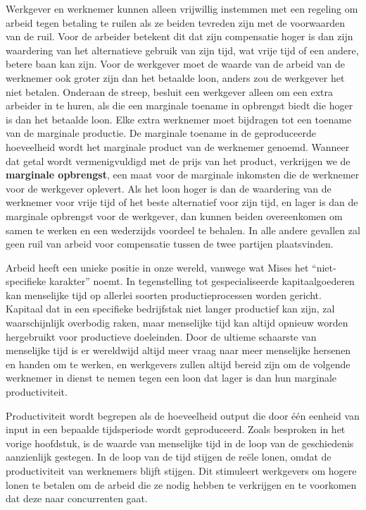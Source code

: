 Werkgever en werknemer kunnen alleen vrijwillig instemmen met een
regeling om arbeid tegen betaling te ruilen als ze beiden tevreden zijn
met de voorwaarden van de ruil. Voor de arbeider betekent dit dat zijn
compensatie hoger is dan zijn waardering van het alternatieve gebruik
van zijn tijd, wat vrije tijd of een andere, betere baan kan zijn. Voor
de werkgever moet de waarde van de arbeid van de werknemer ook groter
zijn dan het betaalde loon, anders zou de werkgever het niet betalen.
Onderaan de streep, besluit een werkgever alleen om een extra arbeider
in te huren, als die een marginale toename in opbrengst biedt die hoger
is dan het betaalde loon. Elke extra werknemer moet bijdragen tot een
toename van de marginale productie. De marginale toename in de
geproduceerde hoeveelheid wordt het marginale product van de werknemer
genoemd. Wanneer dat getal wordt vermenigvuldigd met de prijs van het
product, verkrijgen we de \textbf{marginale opbrengst}, een maat voor de
marginale inkomsten die de werknemer voor de werkgever oplevert. Als het
loon hoger is dan de waardering van de werknemer voor vrije tijd of het
beste alternatief voor zijn tijd, en lager is dan de marginale opbrengst
voor de werkgever, dan kunnen beiden overeenkomen om samen te werken en
een wederzijds voordeel te behalen. In alle andere gevallen zal geen
ruil van arbeid voor compensatie tussen de twee partijen plaatsvinden.

Arbeid heeft een unieke positie in onze wereld, vanwege wat Mises het
\enquote{niet-specifieke karakter} noemt.\autocite{41} In tegenstelling tot gespecialiseerde
kapitaalgoederen kan menselijke tijd op allerlei soorten
productieprocessen worden gericht. Kapitaal dat in een specifieke
bedrijfstak niet langer productief kan zijn, zal waarschijnlijk
overbodig raken, maar menselijke tijd kan altijd opnieuw worden
hergebruikt voor productieve doeleinden. Door de ultieme schaarste van
menselijke tijd is er wereldwijd altijd meer vraag naar meer menselijke
hersenen en handen om te werken, en werkgevers zullen altijd bereid zijn
om de volgende werknemer in dienst te nemen tegen een loon dat lager is
dan hun marginale productiviteit.

Productiviteit wordt begrepen als de hoeveelheid output die door één
eenheid van input in een bepaalde tijdsperiode wordt geproduceerd. Zoals
besproken in het vorige hoofdstuk, is de waarde van menselijke tijd in
de loop van de geschiedenis aanzienlijk gestegen. In de loop van de tijd
stijgen de reële lonen, omdat de productiviteit van werknemers blijft
stijgen. Dit stimuleert werkgevers om hogere lonen te betalen om de
arbeid die ze nodig hebben te verkrijgen en te voorkomen dat deze naar
concurrenten gaat.

